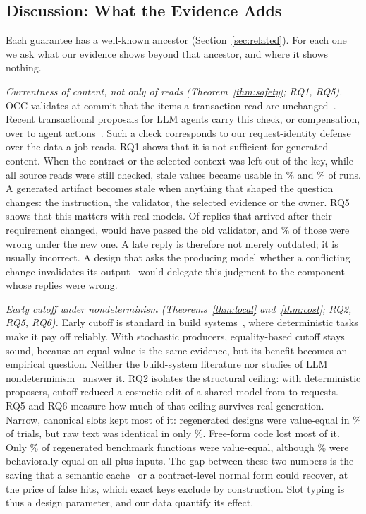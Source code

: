 \subsection{Discussion: What the Evidence Adds}\label{sec:discussion}
Each guarantee has a well-known ancestor (Section~\ref{sec:related}). For each one we ask what our evidence shows beyond that ancestor, and where it shows nothing.

\emph{Currentness of content, not only of reads (Theorem~\ref{thm:safety}; RQ1, RQ5).} OCC validates at commit that the items a transaction read are unchanged~\cite{occ}. Recent transactional proposals for LLM agents carry this check, or compensation, over to agent actions~\cite{chang2025sagallm,lyu2026coagent,yang2026concurrency}. Such a check corresponds to our request-identity defense over the data a job reads. RQ1 shows that it is not sufficient for generated content. When the contract or the selected context was left out of the key, while all source reads were still checked, stale values became usable in \ContractStalePct\% and \ContextStalePct\% of runs. A generated artifact becomes stale when anything that shaped the question changes: the instruction, the validator, the selected evidence or the owner. RQ5 shows that this matters with real models. Of \LlmStaleTrials{} replies that arrived after their requirement changed, \LlmStaleOldValid{} would have passed the old validator, and \LlmStaleWrongPct\% of those were wrong under the new one. A late reply is therefore not merely outdated; it is usually incorrect. A design that asks the producing model whether a conflicting change invalidates its output~\cite{lyu2026coagent} would delegate this judgment to the component whose replies were wrong.

\emph{Early cutoff under nondeterminism (Theorems~\ref{thm:local} and~\ref{thm:cost}; RQ2, RQ5, RQ6).} Early cutoff is standard in build systems~\cite{mitchell2012shake,mokhov,erdweg2015pluto,hammer2014adapton}, where deterministic tasks make it pay off reliably. With stochastic producers, equality-based cutoff stays sound, because an equal value is the same evidence, but its benefit becomes an empirical question. Neither the build-system literature nor studies of LLM nondeterminism~\cite{ouyang2025nondeterminism} answer it. RQ2 isolates the structural ceiling: with deterministic proposers, cutoff reduced a cosmetic edit of a shared model from \CoupledCosmeticNoCut{} to \CoupledCosmeticExact{} requests. RQ5 and RQ6 measure how much of that ceiling survives real generation. Narrow, canonical slots kept most of it: regenerated designs were value-equal in \LlmCutoffDesignValuePct\% of trials, but raw text was identical in only \LlmCutoffDesignRawPct\%. Free-form code lost most of it. Only \BenchValueEqualPct\% of regenerated benchmark functions were value-equal, although \BenchBehEqualPct\% were behaviorally equal on all plus inputs. The gap between these two numbers is the saving that a semantic cache~\cite{bang2023gptcache,schroeder2026vcache} or a contract-level normal form could recover, at the price of false hits, which exact keys exclude by construction. Slot typing is thus a design parameter, and our data quantify its effect.

